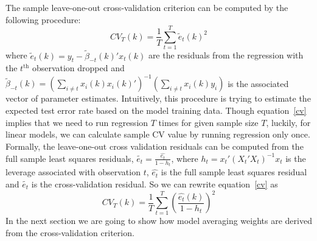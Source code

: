 The sample leave-one-out cross-validation criterion can be computed by the following procedure:
\begin{equation} \label{cv}
	CV_T(k) = \frac{1}{T}\sum_{t=1}^{T}\tilde{e}_{t}(k)^{2}
\end{equation}
where $\tilde{e}_{t}(k) = y_t - \tilde{\beta}_{-t}(k)'x_t(k)$ are the residuals from the regression with the $t^{\mathrm{th}}$ observation dropped and $\tilde{\beta}_{-t}(k) = (\sum_{i\not= t}x_i(k) x_i(k)')^{-1}(\sum_{i\not= t}x_i(k) y_i)$ is the associated vector of parameter estimates. Intuitively, this procedure is trying to estimate the expected test error rate based on the model training data. Though equation~\ref{cv} implies that we need to run regression $T$ times for given sample size $T$, luckily, for linear models, we can calculate sample CV value by running regression only once. Formally, the leave-one-out cross validation residuals can be computed from the full sample least squares residuals, $\tilde{e_{t}} = \frac{\hat{e_{t}}}{1 - h_{t}}$, where $h_{t} = x_{t}'(X_{t}'X_{t})^{-1}x_{t}$ is the leverage associated with observation $t$, $\hat{e_{t}}$ is the full sample least squares residual and $\tilde{e_{t}}$ is the cross-validation residual. So we can rewrite equation~\ref{cv} as
\begin{equation}
    CV_T(k) = \frac{1}{T}\sum_{t=1}^{T}\left( \frac{\hat{e_{t}}(k)}{1 - h_{t}} \right)^{2}
\end{equation}
In the next section we are going to show how model averaging weights are derived from the cross-validation criterion.